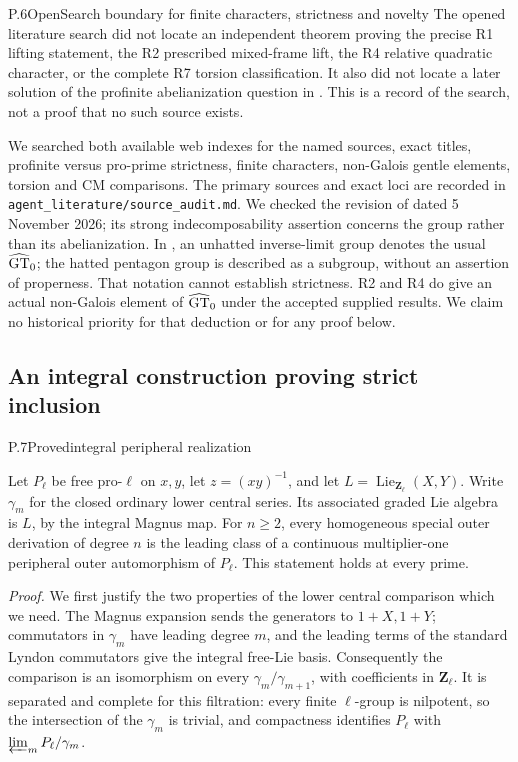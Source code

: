 \begin{statement}{P.6}{Open}{Search boundary for finite characters, strictness and novelty}
The opened literature search did not locate an independent theorem
proving the precise R1 lifting statement, the R2 prescribed mixed-frame
lift, the R4 relative quadratic character, or the complete R7 torsion
classification. It also did not locate a later solution of the profinite
abelianization question in \citet[Question 1.2]{LitLochakSchnepsOpenProblems}.
This is a record of the search, not a proof that no such source exists.
\end{statement}
We searched both available web indexes for the named sources, exact
titles, profinite versus pro-prime strictness, finite characters,
non-Galois gentle elements, torsion and CM comparisons. The primary
sources and exact loci are recorded in
\texttt{agent\_literature/source\_audit.md}. We checked the revision
of \citet{LitCollas2026v2} dated 5 November 2026; its strong
indecomposability assertion concerns the group rather than its
abelianization. In \citet[Proposition 5.20 and closing remarks,
p.373]{LitGuillot2014}, an unhatted inverse-limit group denotes the
usual $\widehat{\mathrm{GT}}_0$; the hatted pentagon group is described as a subgroup,
without an assertion of properness. That notation cannot establish
strictness. R2 and R4 do give an actual non-Galois element of $\widehat{\mathrm{GT}}_0$
under the accepted supplied results. We claim no historical priority
for that deduction or for any proof below.

\subsection{An integral construction proving strict inclusion}


\begin{statement}{P.7}{Proved}{integral peripheral realization}
\end{statement}
Let $P_\ell$ be free pro-$\ell$ on $x,y$, let
$z=(xy)^{-1}$, and let $L=\operatorname{Lie}_{\mathbf Z_\ell}(X,Y)$.
Write $\gamma_m$ for the closed ordinary lower central series. Its
associated graded Lie algebra is $L$, by the integral Magnus map.
For $n\geq2$, every homogeneous special outer derivation of degree $n$
is the leading class of a continuous multiplier-one peripheral outer
automorphism of $P_\ell$. This statement holds at every prime.

\emph{Proof.}
We first justify the two properties of the lower central comparison which
we need. The Magnus expansion sends the generators to $1+X,1+Y$;
commutators in $\gamma_m$ have leading degree $m$, and the leading
terms of the standard Lyndon commutators give the integral free-Lie
basis. Consequently the comparison is an isomorphism on every
$\gamma_m/\gamma_{m+1}$, with coefficients in $\mathbf Z_\ell$.
It is separated and complete for this filtration: every finite
$\ell$-group is nilpotent, so the intersection of the $\gamma_m$ is
trivial, and compactness identifies $P_\ell$ with
$\varprojlim_m P_\ell/\gamma_m$.

